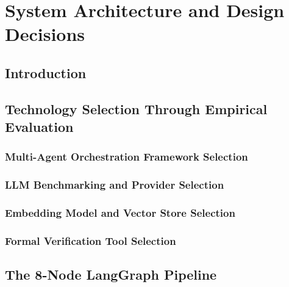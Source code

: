 \documentclass[12pt,a4paper]{report}
\begin{document}
\chapter{System Architecture and Design Decisions}
\label{ch:architecture}

\section{Introduction}
\label{sec:ch4-intro}

\section{Technology Selection Through Empirical Evaluation}
\label{sec:tech-selection}

  \subsection{Multi-Agent Orchestration Framework Selection}
  \label{subsec:framework-selection}

  \subsection{LLM Benchmarking and Provider Selection}
  \label{subsec:llm-benchmarking}

  \subsection{Embedding Model and Vector Store Selection}
  \label{subsec:embedding-selection}

  \subsection{Formal Verification Tool Selection}
  \label{subsec:z3-selection}

\section{The 8-Node LangGraph Pipeline}
\label{sec:pipeline-design}
\end{document}
